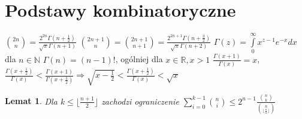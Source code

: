 \documentclass{pracamgr}
\newtheorem{lemma}[theorem]{Lemat}
\begin{document}
  \section{Podstawy kombinatoryczne}
   ${2n \choose n}=\frac{2^{2n}\Gamma(n+\frac{1}{2})}{\sqrt{\pi}\Gamma(n+1)}$\quad\quad
   ${2n+1 \choose n}={2n+1 \choose n+1}=\frac{2^{2n+1}\Gamma(n+\frac{3}{2})}{\sqrt{\pi}\Gamma(n+2)}$\newline
   $\Gamma(z)=\int\limits_{0}^{\infty}x^{z-1}e^{-x}dx$\quad
   dla $n\in\mathbb{N}$ $\Gamma(n)=(n-1)!$,\newline
   ogólniej dla $x\in\mathbb{R},x>1$ $\frac{\Gamma(x+1)}{\Gamma(x)}=x$,
   $\frac{\Gamma(x+\frac{1}{2})}{\Gamma(x)}<\frac{\Gamma(x+1)}{\Gamma(x+\frac{1}{2})}\Rightarrow
   \sqrt{x-\frac{1}{2}}<\frac{\Gamma(x+\frac{1}{2})}{\Gamma(x)}<\sqrt{x}$\newline
   \begin{lemma}\label{binomial sum upper bound}
    Dla $k\le\lfloor\frac{n+1}{2}\rfloor$ zachodzi ograniczenie $\sum_{i=0}^{k-1}{n\choose i}\le2^{n-1}\frac{{n\choose k}}{{n\choose \lfloor\frac{n}{2}\rfloor}}$
   \end{lemma}
\end{document}
